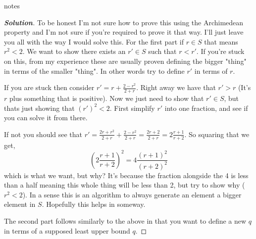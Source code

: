 \documentclass[11pt]{article}
\newenvironment{problem}[2][Problem\!]{\begin{trivlist}
\item[\hskip \labelsep {\bfseries #1}\hskip \labelsep {\bfseries #2}]}{\end{trivlist}}
\newenvironment{solution}{\begin{proof}[\textbf{\textit{Solution}}] }{\end{proof}}
\begin{document}
\begin{tcolorbox}
  \begin{problem} {13.3}
    notes
  \end{problem}
\end{tcolorbox}
\begin{solution}
  To be honest I'm not sure how to prove this using the Archimedean property and I'm not sure if you're required to prove it that way. I'll just leave you all with the way I would solve this. For the first part if $r \in S$ that means $r^{2} < 2$. We want to show there exists an $r'\in S$ such that $r < r'$. If you're stuck on this, from my experience these are usually proven defining the bigger "thing" in terms of the smaller "thing". In other words try to define $r'$ in terms of $r$. 

  If you are stuck then consider $r' = r + \frac{2 - r^{2}}{2 + r}$. Right away we have that $r' > r$ (It's $r$ plus something that is positive). Now we just need to show that $r' \in S$, but thats just showing that $(r')^{2} < 2$. First simplify $r'$ into one fraction, and see if you can solve it from there. 
  
  If not you should see that $r' = \frac{2r + r^{2}}{2 + r} + \frac{2-r^{2}}{2+r} = \frac{2r + 2}{2 + r} = 2\frac{r + 1}{r + 2}$. So squaring that we get, 
  \[( 2 \frac{r +1}{r +2} )^{2} = 4 \frac{ (r+1)^{2} }{(r+2)^{2}}\]
  which is what we want, but why? It's because the fraction alongside the 4 is less than a half meaning this whole thing will be less than 2, but try to show why ($r^{2} < 2$). In a sense this is an algorithm to always generate an element a bigger element in $S$. Hopefully this helps in someway. 
  
  The second part follows similarly to the above in that you want to define a new $q$ in terms of a supposed least upper bound $q$.
\end{solution}
\end{document}
